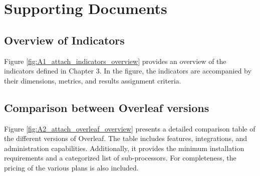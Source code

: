 
\chapter{Supporting Documents}
\label{cha:attachment_overleaf_comparison}

\section{Overview of Indicators}
Figure \ref{fig:A1_attach_indicators_overview} provides an overview of the indicators defined in Chapter 3. In the figure, the indicators are accompanied by their dimensions, metrics, and results assignment criteria.

\section{Comparison between Overleaf versions}
Figure \ref{fig:A2_attach_overleaf_overview} presents a detailed comparison table of the different versions of Overleaf. The table includes features, integrations, and administration capabilities. Additionally, it provides the minimum installation requirements and a categorized list of sub-processors. For completeness, the pricing of the various plans is also included.

\newpage

% 
% 

%     

%     

